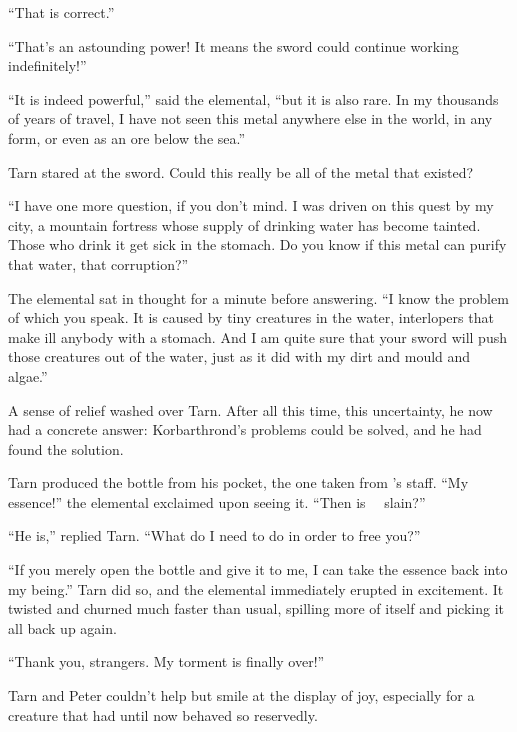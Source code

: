``That is correct.''

``That's an astounding power!  It means the sword could continue working indefinitely!''

``It is indeed powerful,'' said the elemental, ``but it is also rare.  In my thousands of years of travel, I have not seen this metal anywhere else in the world, in any form, or even as an ore below the sea.''

Tarn stared at the sword.  Could this really be all of the metal that existed?

``I have one more question, if you don't mind.  I was driven on this quest by my city, a mountain fortress whose supply of drinking water has become tainted.  Those who drink it get sick in the stomach.  Do you know if this metal can purify that water, that corruption?''

The elemental sat in thought for a minute before answering.  ``I know the problem of which you speak.  It is caused by tiny creatures in the water, interlopers that make ill anybody with a stomach.  And I am quite sure that your sword will push those creatures out of the water, just as it did with my dirt and mould and algae.''

A sense of relief washed over Tarn.  After all this time, this uncertainty, he now had a concrete answer: Korbarthrond's problems could be solved, and he had found the solution.

Tarn produced the bottle from his pocket, the one taken from \mothzam's staff.  ``My essence!'' the elemental exclaimed upon seeing it.  ``Then is \mothzam\ \driktur\ slain?''

``He is,'' replied Tarn.  ``What do I need to do in order to free you?''

``If you merely open the bottle and give it to me, I can take the essence back into my being.''  Tarn did so, and the elemental immediately erupted in excitement.  It twisted and churned much faster than usual, spilling more of itself and picking it all back up again.

``Thank you, strangers.  My torment is finally over!''

Tarn and Peter couldn't help but smile at the display of joy, especially for a creature that had until now behaved so reservedly.





